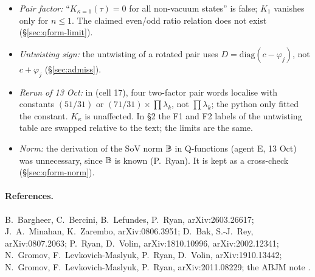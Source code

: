 \begin{itemize}
  and it is not needed.
\item \emph{Pair factor:} ``$K_{\kappa=1}(\tau)=0$ for all non-vacuum states'' is false; $K_1$ vanishes only for $n\le1$. The
  claimed even/odd ratio relation does not exist (\S\ref{sec:qform-limit}).
\item \emph{Untwisting sign:} the untwisting of a rotated pair uses $D=\mathrm{diag}(c-\varphi_j)$, not $c+\varphi_j$
  (\S\ref{sec:admiss}).
\item \emph{Rerun of 13 Oct:} in  (cell 17), four two-factor pair words localise with constants
  $(51/31)$ or $(71/31)\times\prod\lambda_k$, not $\prod\lambda_k$; the python only fitted the constant. $K_\kappa$ is unaffected.
  In  \S2 the F1 and F2 labels of the untwisting table are swapped relative to the text; the limits
  are the same.
\item \emph{Norm:} the derivation of the SoV norm $\mathbb B$ in Q-functions (agent E, 13 Oct) was unnecessary, since $\mathbb B$ is known
  (P.~Ryan). It is kept as a cross-check (\S\ref{sec:qform-norm}).
\end{itemize}

\paragraph{References.}{\sloppy B.~Bargheer, C.~Bercini, B.~Lefundes, P.~Ryan, arXiv:2603.26617; J.~A.~Minahan, K.~Zarembo,
arXiv:0806.3951; D.~Bak, S.-J.~Rey, arXiv:0807.2063; P.~Ryan, D.~Volin, arXiv:1810.10996, arXiv:2002.12341;
N.~Gromov, F.~Levkovich-Maslyuk, P.~Ryan, D.~Volin, arXiv:1910.13442; N.~Gromov, F.~Levkovich-Maslyuk, P.~Ryan,
arXiv:2011.08229; the ABJM note .\par}
